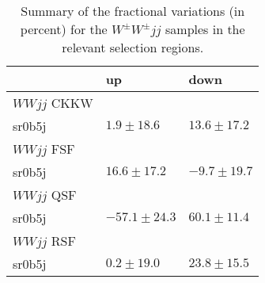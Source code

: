 \begin{table}[htb]
  \caption{Summary of the fractional variations (in percent) for the
    $W^\pm{}W^\pm{}jj$ samples in the relevant selection regions.}
\begin{center}
\begin{tabular}{lll}
 & up & down\\
\hline
$WWjj$ CKKW &  & \\
sr0b5j & $1.9 \pm 18.6$ & $13.6 \pm 17.2$\\
\hline
$WWjj$ FSF &  & \\
sr0b5j & $16.6 \pm 17.2$ & $-9.7 \pm 19.7$\\
\hline
$WWjj$ QSF &  & \\
sr0b5j & $-57.1 \pm 24.3$ & $60.1 \pm 11.4$\\
\hline
$WWjj$ RSF &  & \\
sr0b5j & $0.2 \pm 19.0$ & $23.8 \pm 15.5$\\
\end{tabular}
\end{center}
\label{tab:app_wwjjvariations}
\end{table}
